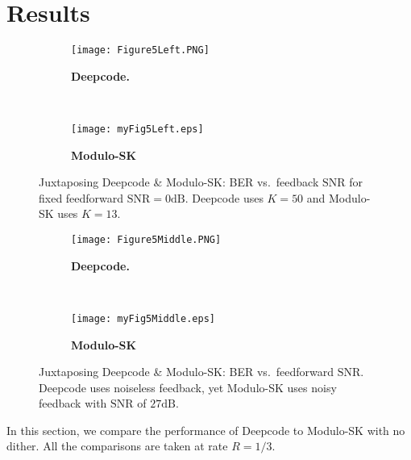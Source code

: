 \documentclass[article,onecolumn,11pt]{IEEEtran}
\newcommand{\dB}{\mathrm{dB}}
\newcommand{\snr}{\mathrm{SNR}}
\begin{document}
\section{Results}
\begin{figure*}[!ht]
    \centering
    \begin{subfigure}[t]{0.5\textwidth}
        \centering
        \texttt{[image: Figure5Left.PNG]}
        \caption{
        \textbf{Deepcode. \cite[Figure~5 (Left)]{kim2018deepcode}}
        \label{fig:Figure5LeftDeepcode}
        }
    \end{subfigure}%
    ~ 
    \begin{subfigure}[t]{0.5\textwidth}
        \centering
        \texttt{[image: myFig5Left.eps]}
        \caption{\textbf{Modulo-SK}
        \label{fig:Figure5LeftMSK}
        }
     \end{subfigure}
    \caption{Juxtaposing Deepcode \& Modulo-SK: BER vs.~feedback $\snr$ for fixed feedforward $\snr=0\dB$. Deepcode uses $K=50$ and Modulo-SK uses $K=13$.
    }
\end{figure*}

\begin{figure*}[!ht]
    \centering
    \begin{subfigure}[t]{0.5\textwidth}
        \centering
        \texttt{[image: Figure5Middle.PNG]}
        \caption{\textbf{Deepcode. \cite[Figure~5 (Middle)]{kim2018deepcode}}
        \label{fig:Figure5middleDeepCode}
        }
    \end{subfigure}%
    ~ 
    \begin{subfigure}[t]{0.5\textwidth}
        \centering
        \texttt{[image: myFig5Middle.eps]}
        \caption{\textbf{Modulo-SK}
        \label{fig:Figure5middleModuloSK}
        }
     \end{subfigure}
    \caption{Juxtaposing Deepcode \& Modulo-SK: BER vs.~feedforward $\snr$. Deepcode uses noiseless feedback, yet Modulo-SK uses noisy feedback with $\snr$ of $27\dB$. \label{fig:Figure5middle}}
\end{figure*}
In this section, we compare the performance of Deepcode to Modulo-SK with no dither. All the comparisons are taken at rate $R=1/3$. 
\end{document}
